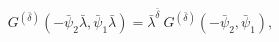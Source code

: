 \begin{equation}
G^{(\bar{\delta})}(-\bar{\psi}_{2} \bar{\lambda},\bar{\psi}_{1}
\bar{\lambda})=\bar{\lambda}^{\bar{\delta}}~
G^{(\bar{\delta})}(-\bar{\psi}_{2},\bar{\psi}_{1}),
\end{equation}

